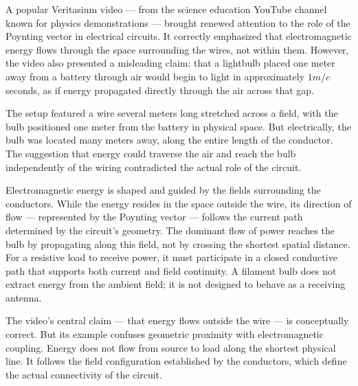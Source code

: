 \begin{commentary}
A popular Veritasium video — from the science education YouTube channel known for physics demonstrations — brought renewed attention to the role of the Poynting vector in electrical circuits. It correctly emphasized that electromagnetic energy flows through the space surrounding the wires, not within them. However, the video also presented a misleading claim: that a lightbulb placed one meter away from a battery through air would begin to light in approximately $1 m/c$ seconds, as if energy propagated directly through the air across that gap.

The setup featured a wire several meters long stretched across a field, with the bulb positioned one meter from the battery in physical space. But electrically, the bulb was located many meters away, along the entire length of the conductor. The suggestion that energy could traverse the air and reach the bulb independently of the wiring contradicted the actual role of the circuit.

Electromagnetic energy is shaped and guided by the fields surrounding the conductors. While the energy resides in the space outside the wire, its direction of flow — represented by the Poynting vector — follows the current path determined by the circuit's geometry. The dominant flow of power reaches the bulb by propagating along this field, not by crossing the shortest spatial distance. For a resistive load to receive power, it must participate in a closed conductive path that supports both current and field continuity. A filament bulb does not extract energy from the ambient field; it is not designed to behave as a receiving antenna.

The video's central claim — that energy flows outside the wire — is conceptually correct. But its example confuses geometric proximity with electromagnetic coupling. Energy does not flow from source to load along the shortest physical line. It follows the field configuration established by the conductors, which define the actual connectivity of the circuit.
\end{commentary}